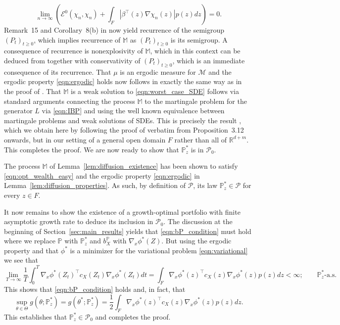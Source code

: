 \documentclass{article}
\makeatletter
\theoremstyle{plain}
\theoremstyle{definition}
\newcommand{\R}{\mathbb{R}}
\renewcommand{\P}{\mathbb{P}}
\newcommand{\Ecal}{{\mathcal E}}
\newcommand{\Pcal}{{\mathcal P}}
\numberwithin{lem}{section}
\renewenvironment{proof}[1][\proofname] {\par\pushQED{\qed}\normalfont\topsep6\p@\@plus6\p@\relax\trivlist\item[\hskip\labelsep\bfseries#1\@addpunct{.}]\ignorespaces}{\popQED\endtrivlist\@endpefalse}
\makeatother
\begin{document}
\begin{proof}
\[\lim_{n \to \infty} \left(\Ecal^0(\chi_n,\chi_n) + \int_F|\beta^\top(z)\nabla \chi_n(z)|p(z)dz\right)  = 0.\]
Remark~15 and Corollary~8(b) in \cite{gim2018recurrence} now yield recurrence of the semigroup $(P_t)_{t \geq 0}$, which implies recurrence of $\mathbb{M}$ as $(P_t)_{t \geq 0}$ is its semigroup. A consequence of recurrence is nonexplosivity of $\mathbb{M}$, which in this context can be deduced from \cite[Corollary~3.23]{leeanalytic2022} together with conservativity of $(P_t)_{t \geq 0}$, which is an immediate consequence of its recurrence. That $\mu$ is an ergodic measure for $\mathcal{M}$ and the ergodic property \eqref{eqn:ergodic} holds now follows in exactly the same way as in the proof of \cite[Lemma~C.5]{itkin2025ergodic}. That $\mathbb{M}$ is a weak solution to \eqref{eqn:worst_case_SDE} follows via standard arguments connecting the process $\mathbb{M}$ to the martingale problem for the generator $L$ via \eqref{eqn:IBP} and using the well known equivalence between martingale problems and weak solutions of SDEs. This is precisely the result \cite[Theorem~3.22(i)]{leeanalytic2022}, which we obtain here by following the proof of \cite[Chapter~3]{leeanalytic2022} verbatim from Proposition~3.12 onwards, but in our setting of a general open domain $F$ rather than all of $\R^{d+m}$. This completes the proof.   \end{proof}
We are now ready to show that $\P^*_z$ is in $\Pcal_0$.
\begin{proof}[Proof of Proposition~\ref{prop:worst_case}]
The process $\mathbb{M}$ of Lemma~\ref{lem:diffusion_existence} has been shown to satisfy \eqref{eqn:opt_wealth_easy} and the ergodic property \eqref{eqn:ergodic} in Lemma~\ref{lem:diffusion_properties}. As such, by definition of $\Pcal$,  its law $\P^*_z \in \Pcal$ for every $z \in F$.

It now remains to show the existence of a growth-optimal portfolio with finite asymptotic growth rate to deduce its inclusion in $\Pcal_0$. The discussion at the beginning of Section~\ref{sec:main_results} yields that \eqref{eqn:bP_condition} must hold where we replace $\P$ with $\P^*_z$ and $b_X^\P$ with $\nabla_x \phi^*(Z)$. But using the ergodic property and that $\phi^*$ is a minimizer for the variational problem \eqref{eqn:variational} we see that 
\[\lim_{T \to \infty} \frac{1}{T}\int_0^T \nabla_x \phi^*(Z_t)^\top c_X(Z_t)\nabla_x \phi^*(Z_t)dt = \int_F \nabla_x \phi^*(z)^\top c_X(z)\nabla_x \phi^*(z)p(z)dz < \infty; \qquad \P^*_z\text{-a.s.}\]
This shows that \eqref{eqn:bP_condition} holds and, in fact, that
\begin{equation} \label{eqn:worst_case_growth}
    \sup_{\theta \in \Theta} g(\theta;\P^*_z) = g(\theta^*;\P^*_z) = \frac{1}{2}\int_F \nabla_x \phi^*(z)^\top c_X(z)\nabla_x \phi^*(z)p(z)dz.
\end{equation}
This establishes that $\P^*_z \in \Pcal_0$ and completes the proof.
\end{proof}
\end{document}
